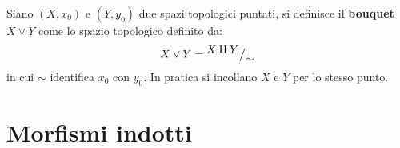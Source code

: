 \begin{definition}
  Siano $ (X,x_0) $ e $ (Y,y_0) $ due spazi topologici puntati, si definisce il \textbf{bouquet}
  $ X \vee Y $ come lo spazio topologico definito da:
  \[
    X \vee Y = \quot{X \invamalg Y}{\sim}
  \]
  in cui $ \sim $ identifica $ x_0 $ con $ y_0 $. In pratica si incollano $ X $ e $ Y $ per lo stesso punto.
\end{definition}


\section{Morfismi indotti}

